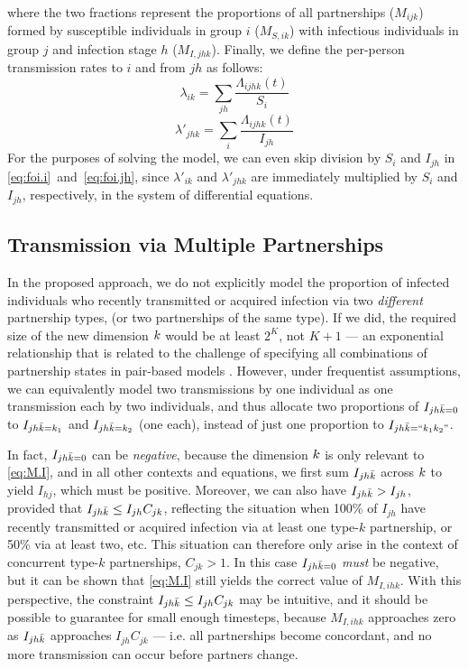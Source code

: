 where the two fractions represent the proportions of all partnerships ($M_{ijk}$)
formed by susceptible individuals in group $i$ ($M_{S,ik}$)
with infectious individuals in group $j$ and infection stage $h$ ($M_{I,jhk}$).
Finally, we define the per-person transmission rates
to $i$ and from $jh$ as follows:
\begin{equation}\label{eq:foi.i}
  \lambda_{ik} = \sum_{jh} \frac{\Lambda_{ijhk}(t)}{S_{i}}
\end{equation}
\begin{equation}\label{eq:foi.jh}
  \lambda'_{jhk} = \sum_{i} \frac{\Lambda_{ijhk}(t)}{I_{jh}}
\end{equation}
For the purposes of solving the model,
we can even skip division by $S_i$ and $I_{jh}$ in \eqref{eq:foi.i}~and~\eqref{eq:foi.jh},
since $\lambda'_{ik}$ and $\lambda'_{jhk}$ are immediately multiplied by $S_i$ and $I_{jh}$,
respectively, in the system of differential equations.
\subsection{Transmission via Multiple Partnerships}\label{prop.mp}
In the proposed approach, we do not explicitly model the proportion of infected individuals
who recently transmitted or acquired infection via two \emph{different} partnership types,
(or two partnerships of the same type).
If we did, the required size of the new dimension $\k$ would be at least $2^{K}$, not $K+1$
--- an exponential relationship that is related to the challenge of
specifying all combinations of partnership states in pair-based models \cite{Kretzschmar2017}.
However, under frequentist assumptions, we can equivalently model
two transmissions by one individual as one transmission each by two individuals,
and thus allocate two proportions of $I_{jh\k=0}$ to $I_{jh\k=k_1}$ and $I_{jh\k=k_2}$ (one each),
instead of just one proportion to $I_{jh\k={\textnormal{``}k_1k_2\textnormal{''}}}$.
\par
In fact, $I_{jh\k=0}$ can be \emph{negative},
because the dimension $\k$ is only relevant to \eqref{eq:M.I},
and in all other contexts and equations,
we first sum $I_{jh\k}$ across $\k$ to yield $I_{hj}$, which must be positive.
Moreover, we can also have $I_{jh\k} > I_{jh}$, provided that $I_{jh\k} \le I_{jh} C_{jk}$,
reflecting the situation when 100\% of $I_{jh}$
have recently transmitted or acquired infection via at least one type-$k$ partnership,
or 50\% via at least two, etc.
This situation can therefore only arise in the context of
concurrent type-$k$ partnerships, $C_{jk} > 1$.
In this case $I_{jh\k=0}$ \emph{must} be negative,
but it can be shown that \eqref{eq:M.I} still yields the correct value of $M_{I,ihk}$.
With this perspective, the constraint $I_{jh\k} \le I_{jh} C_{jk}$ may be intuitive,
and it should be possible to guarantee for small enough timesteps,
because $M_{I,ihk}$ approaches zero as $I_{jh\k}$ approaches $I_{jh} C_{jk}$
--- i.e. all partnerships become concordant,
and no more transmission can occur before partners change.
